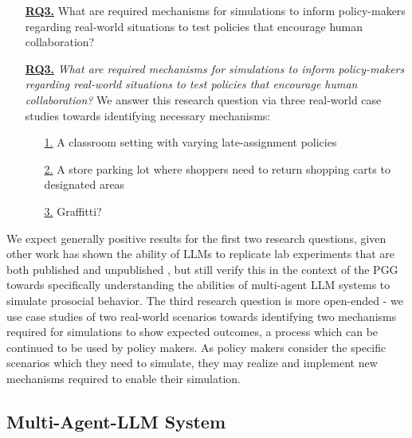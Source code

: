 \bigskip

\begin{itemize}
  \item[\underline{\textbf{RQ3.}}] What are required mechanisms for simulations to
inform policy-makers regarding real-world situations to test policies that encourage human collaboration?
\end{itemize}

\bigskip

\color{blue}

\begin{itemize}
  \item[\underline{\textbf{RQ3.}}] \textit{What are required mechanisms for simulations to
inform policy-makers regarding real-world situations to test policies that encourage human collaboration?} We answer this research question via three real-world case studies towards identifying necessary mechanisms:
\begin{itemize}[leftmargin=0.5in]
    \item[\underline{1.}] A classroom setting with varying late-assignment policies
    \item[\underline{2.}] A store parking lot where shoppers need to return shopping carts to designated areas
    \item[\underline{3.}] Graffitti?
  \end{itemize}
\end{itemize}

\color{black}

\bigskip

We expect generally positive results for the first two research questions, given other work has shown the ability of LLMs to replicate lab experiments that are both published and unpublished \cite{hewitt2024predicting}, but still verify this in the context of the PGG towards specifically understanding the abilities of multi-agent LLM systems to simulate prosocial behavior. \color{red}The third research question is more open-ended - we use case studies of two real-world scenarios towards identifying two mechanisms required for simulations to show expected outcomes, a process which can be continued to be used by policy makers. As policy makers consider the specific scenarios which they need to simulate, they may realize and implement new mechanisms required to enable their simulation.\color{black}

\subsection{Multi-Agent-LLM System}

